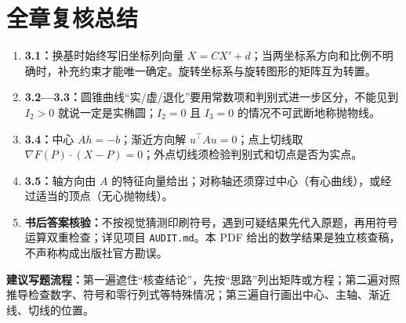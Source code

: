 \documentclass[UTF8,a4paper,11pt,fontset=none]{ctexart}
\newcommand{\readtip}[1]{\begin{tcolorbox}[colback=pale,colframe=edge,boxrule=0.4pt,arc=1.5mm,left=3mm,right=3mm,top=2mm,bottom=2mm]#1\end{tcolorbox}}
\begin{document}
\section*{全章复核总结}
\begin{enumerate}
\item \textbf{3.1：}换基时始终写旧坐标列向量 $X=CX'+d$；当两坐标系方向和比例不明确时，补充约束才能唯一确定。旋转坐标系与旋转图形的矩阵互为转置。
\item \textbf{3.2—3.3：}圆锥曲线“实/虚/退化”要用常数项和判别式进一步区分，不能见到 $I_2>0$ 就说一定是实椭圆；$I_2=0$ 且 $I_3=0$ 的情况不可武断地称抛物线。
\item \textbf{3.4：}中心 $Ah=-b$；渐近方向解 $u^\top Au=0$；点上切线取 $\nabla F(P)\cdot(X-P)=0$；外点切线须检验判别式和切点是否为实点。
\item \textbf{3.5：}轴方向由 $A$ 的特征向量给出；对称轴还须穿过中心（有心曲线），或经过适当的顶点（无心抛物线）。
\item \textbf{书后答案核验：}不按视觉猜测印刷符号，遇到可疑结果先代入原题，再用符号运算双重检查；详见项目 \texttt{AUDIT.md}。本 PDF 给出的数学结果是独立核查稿，不声称构成出版社官方勘误。
\end{enumerate}
\readtip{\textbf{建议写题流程：}第一遍遮住“核查结论”，先按“思路”列出矩阵或方程；第二遍对照推导检查数字、符号和零行列式等特殊情况；第三遍自行画出中心、主轴、渐近线、切线的位置。}
\end{document}
